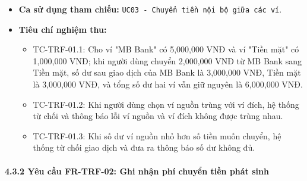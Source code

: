 \documentclass[11pt,a4paper]{article}
\providecommand{\tightlist}{
  \setlength{\itemsep}{0pt}\setlength{\parskip}{0pt}}
\begin{document}
\begin{itemize}
  \begin{itemize}
  \tightlist
  \item
    Bản ghi chuyển tiền nội bộ mới được lưu vào bảng \texttt{transfers}
    với mã định danh duy nhất (\texttt{transferId}).
  \item
    Số dư của hai ví liên quan được cập nhật đồng thời.
  \item
    Thông báo chuyển tiền thành công.
  \end{itemize}
\item
  \textbf{Ca sử dụng tham chiếu:}
  \texttt{UC03\ -\ Chuyển\ tiền\ nội\ bộ\ giữa\ các\ ví}.
\item
  \textbf{Tiêu chí nghiệm thu:}

  \begin{itemize}
  \tightlist
  \item
    TC-TRF-01.1: Cho ví "MB Bank" có 5,000,000 VNĐ và ví "Tiền mặt" có
    1,000,000 VNĐ; khi người dùng chuyển 2,000,000 VNĐ từ MB Bank sang
    Tiền mặt, số dư sau giao dịch của MB Bank là 3,000,000 VNĐ, Tiền mặt
    là 3,000,000 VNĐ, và tổng số dư hai ví vẫn giữ nguyên là 6,000,000
    VNĐ.
  \item
    TC-TRF-01.2: Khi người dùng chọn ví nguồn trùng với ví đích, hệ
    thống từ chối và thông báo lỗi ví nguồn và ví đích không được trùng
    nhau.
  \item
    TC-TRF-01.3: Khi số dư ví nguồn nhỏ hơn số tiền muốn chuyển, hệ
    thống từ chối giao dịch và đưa ra thông báo số dư không đủ.
  \end{itemize}
\end{itemize}

\newpage

\paragraph{4.3.2 Yêu cầu FR-TRF-02: Ghi nhận phí chuyển tiền phát
sinh}\label{432-yuxeau-cux1ea7u-fr-trf-02-ghi-nhux1eadn-phuxed-chuyux1ec3n-tiux1ec1n-phuxe1t-sinh}
\end{document}
